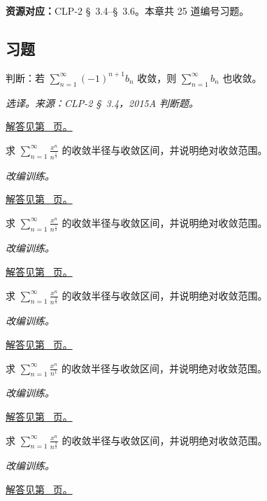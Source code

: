\documentclass[12pt,fontset=fandol]{ctexart}
\begin{document}
\textbf{资源对应：}CLP-2 \S~3.4--\S~3.6。本章共 25 道编号习题。
\subsection{习题}
\begin{example}[交错收敛不推出绝对收敛]\label{ex:c26q1}
判断：若 $\sum_{n=1}^\infty(-1)^{n+1}b_n$ 收敛，则 $\sum_{n=1}^\infty b_n$ 也收敛。
\par\textit{选译。来源：CLP-2 \S~3.4，2015A 判断题。}\par\hyperref[ans:c26q1]{解答见第~\pageref{ans:c26q1} 页。}
\end{example}
\begin{example}[交错幂级数的端点]\label{ex:c26q2}
求 $\displaystyle\sum_{n=1}^\infty\frac{x^n}{n^{\frac{1}{3}}}$ 的收敛半径与收敛区间，并说明绝对收敛范围。
\par\textit{改编训练。}\par\hyperref[ans:c26q2]{解答见第~\pageref{ans:c26q2} 页。}
\end{example}
\begin{example}[交错幂级数的端点]\label{ex:c26q3}
求 $\displaystyle\sum_{n=1}^\infty\frac{x^n}{n^{\frac{1}{2}}}$ 的收敛半径与收敛区间，并说明绝对收敛范围。
\par\textit{改编训练。}\par\hyperref[ans:c26q3]{解答见第~\pageref{ans:c26q3} 页。}
\end{example}
\begin{example}[交错幂级数的端点]\label{ex:c26q4}
求 $\displaystyle\sum_{n=1}^\infty\frac{x^n}{n^{\frac{2}{3}}}$ 的收敛半径与收敛区间，并说明绝对收敛范围。
\par\textit{改编训练。}\par\hyperref[ans:c26q4]{解答见第~\pageref{ans:c26q4} 页。}
\end{example}
\begin{example}[交错幂级数的端点]\label{ex:c26q5}
求 $\displaystyle\sum_{n=1}^\infty\frac{x^n}{n^{1}}$ 的收敛半径与收敛区间，并说明绝对收敛范围。
\par\textit{改编训练。}\par\hyperref[ans:c26q5]{解答见第~\pageref{ans:c26q5} 页。}
\end{example}
\begin{example}[交错幂级数的端点]\label{ex:c26q6}
求 $\displaystyle\sum_{n=1}^\infty\frac{x^n}{n^{\frac{3}{2}}}$ 的收敛半径与收敛区间，并说明绝对收敛范围。
\par\textit{改编训练。}\par\hyperref[ans:c26q6]{解答见第~\pageref{ans:c26q6} 页。}
\end{example}
\end{document}
